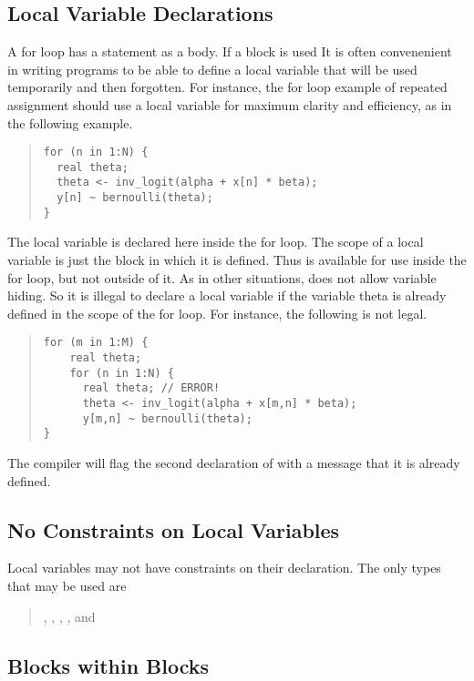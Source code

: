 \subsection{Local Variable Declarations}

A for loop has a statement as a body.  If a block is used 
It is often convenenient in writing programs to be able to define a
local variable that will be used temporarily and then forgotten.  
For instance, the for loop example of repeated assignment should
use a local variable for maximum clarity and efficiency, as in the
following example.
%
\begin{quote}
\begin{Verbatim}
for (n in 1:N) {
  real theta;
  theta <- inv_logit(alpha + x[n] * beta);
  y[n] ~ bernoulli(theta);
}
\end{Verbatim}
\end{quote}
%
The local variable  is declared here inside the for loop.
The scope of a local variable is just the block in which it is
defined.  Thus  is available for use inside the for loop,
but not outside of it.  As in other situations, \Stan does not allow
variable hiding.  So it is illegal to declare a local variable
 if the variable theta is already defined in the scope of
the for loop.  For instance, the following is not legal.
%
\begin{quote}
\begin{Verbatim}
for (m in 1:M) {
    real theta;
    for (n in 1:N) {
      real theta; // ERROR!
      theta <- inv_logit(alpha + x[m,n] * beta);
      y[m,n] ~ bernoulli(theta);
}
\end{Verbatim}
\end{quote}
%
The compiler will flag the second declaration of  with a
message that it is already defined.

\subsection{No Constraints on Local Variables}

Local variables may not have constraints on their declaration.  The
only types that may be used are
\begin{quote}
, , 
, , and 
\end{quote}

\subsection{Blocks within Blocks}

